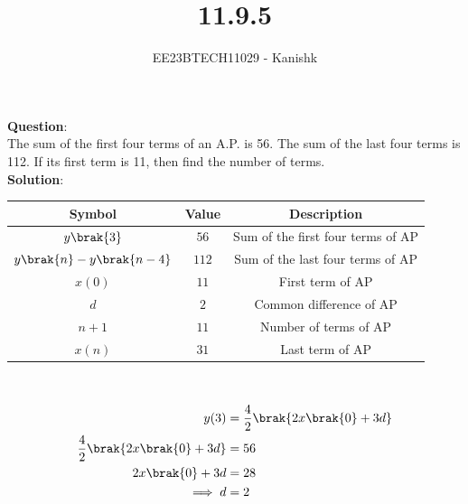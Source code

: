 \documentclass[journal,12pt,twocolumn]{IEEEtran}
\theoremstyle{remark}
\begin{document}

\vspace{3cm}

\title{11.9.5}
\author{EE23BTECH11029 - Kanishk}
\maketitle

\bigskip



\renewcommand{\thefigure}{\theenumi}
\renewcommand{\thetable}{\theenumi}
\textbf{Question}:\\ 
The sum of the first four terms of an A.P. is 56. The sum of the last four terms is
112. If its first term is 11, then find the number of terms.\\

\textbf{Solution}:\\ 

\footnotesize
\centering
\begin{tabular}{|c|c|c|}
\hline
Symbol & Value & Description\\
\hline
$y\brak{3}$ & $56$ & Sum of the first four terms of AP\\
\hline
$y\brak{n}-y\brak{n-4}$ & $112$& Sum of the last four terms of AP\\
\hline
$x(0)$ & $11$ & First term of AP \\
\hline
$d$ &$ 2$ & Common difference of AP\\
\hline
$n+1$ & $11$ & Number of terms of AP\\
\hline
$x(n)$ & $31$ & Last term of AP\\
\hline

\end{tabular}
\\
\small


\begin{align}
y(3)&=\frac{4}{2}\brak{2x\brak{0}+3d}\\
\frac{4}{2}\brak{2x\brak{0}+3d}&=56\\
2x\brak{0}+3d&=28\\
\implies d&=2
\end{align}
\end{document}
